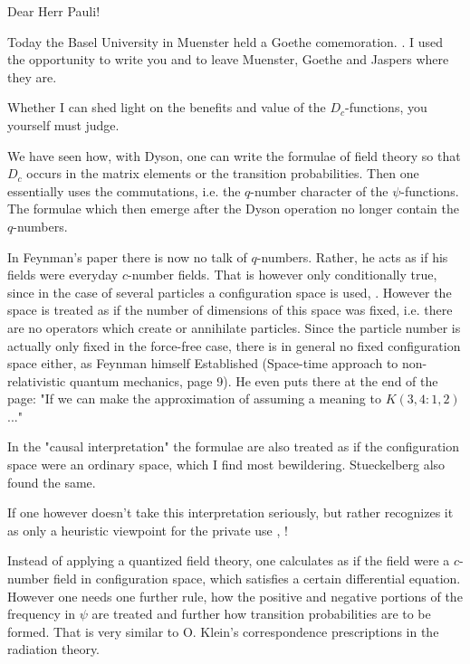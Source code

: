 \documentclass{article}
\begin{document}
Dear Herr Pauli!

Today the Basel University in Muenster held a Goethe comemoration. . I used the opportunity to write you and to leave Muenster, Goethe and Jaspers where they are.

Whether I can shed light on the benefits and value of the $D_c$-functions, you yourself must judge.

We have seen how, with Dyson, one can write the formulae of field theory so that $D_c$ occurs in the matrix elements or the transition probabilities. Then one essentially uses the commutations, i.e. the $q$-number character of the $\psi$-functions. The formulae which then emerge after the Dyson operation no longer contain the $q$-numbers.

In Feynman's paper there is now no talk of $q$-numbers. Rather, he acts as if his fields were everyday $c$-number fields. That is however only conditionally true, since in the case of several particles a configuration space is used, . However the space is treated as if the number of dimensions of this space was fixed, i.e. there are no operators which create or annihilate particles. Since the particle number is actually only fixed in the force-free case, there is in general no fixed configuration space either, as Feynman himself Established (Space-time approach to non-relativistic quantum mechanics, page 9). He even puts there at the end of the page: "If we can make the approximation of assuming a meaning to $K(3,4: 1,2)$..."

In the "causal interpretation" the formulae are also treated as if the configuration space were an ordinary space, which I find most bewildering. Stueckelberg also found the same.

If one however doesn't take this interpretation seriously, but rather recognizes it as only a heuristic viewpoint for the private use , !

Instead of applying a quantized field theory, one calculates as if the field were a $c$-number field in configuration space, which satisfies a certain differential equation. However one needs one further rule, how the positive and negative portions of the frequency in $\psi$ are treated and further how transition probabilities are to be formed. That is very similar to O. Klein's correspondence prescriptions in the radiation theory.
\end{document}
